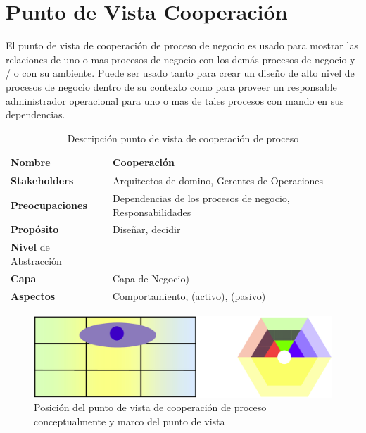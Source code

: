       \section{Punto de Vista Cooperación}
      El punto de vista de cooperación de proceso de negocio es usado para mostrar las relaciones
      de uno o mas procesos de negocio con los demás procesos de negocio y / o con su ambiente. Puede ser usado tanto para crear un diseño de alto nivel de procesos de negocio dentro de su contexto como para proveer un responsable administrador operacional para uno o mas de tales procesos con mando en sus dependencias. \cite{ref9}

      \begin{table}[h]
      	\centering
      	\begin{tabular}{p{3.7cm}p{8cm}}
      		\hline
      		\textbf{Nombre} & \textbf{Cooperación} \\
      		\hline
      		\textbf{Stakeholders} & Arquitectos de domino, Gerentes de Operaciones \\
      		\textbf{Preocupaciones} & Dependencias de los procesos de negocio, Responsabilidades \\
      		\textbf{Propósito} & Diseñar, decidir \\
      		\textbf{Nivel} de Abstracción \\
      		\textbf{Capa} & Capa de Negocio) \\
      		\textbf{Aspectos} & Comportamiento, (activo), (pasivo) \\
      	\end{tabular}
      	\caption{Descripción punto de vista de cooperación de proceso \cite{ref9}}
      	\label{tabla8}
      \end{table}

      \begin{figure}[h]
      	\centering
      	\includegraphics[scale=0.2]{Imagenes/Figuras/18.png}
      	\caption{Posición del punto de vista de cooperación de proceso conceptualmente y marco del punto de vista \cite{ref9}}
      	\label{figura18}
      \end{figure}

